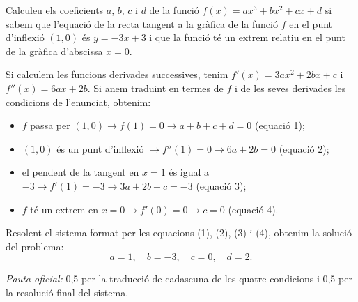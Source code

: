 \begin{apartats}

Calculeu els coeficients $a$, $b$, $c$ i $d$ de la funció $f(x)=ax^3+bx^2+cx+d$ si sabem que l'equació de la recta
tangent a la gràfica de la funció $f$ en el punt d'inflexió $(1,0)$ és $y=-3x+3$ i que la funció té un extrem relatiu
en el punt de la gràfica d'abscissa $x=0$.

\begin{solucio}
Si calculem les funcions derivades successives, tenim $f'(x)=3ax^2+2bx+c$ i $f''(x)=6ax+2b$. Si anem traduint en
termes de $f$ i de les seves derivades les condicions de l'enunciat, obtenim:
\begin{itemize}
\item $f$ passa per $(1,0)\rightarrow f(1)=0\rightarrow a+b+c+d=0$ (equació 1);
\item $(1,0)$ és un punt d'inflexió $\rightarrow f''(1)=0\rightarrow6a+2b=0$ (equació 2);
\item el pendent de la tangent en $x=1$ és igual a $-3\rightarrow f'(1)=-3\rightarrow3a+2b+c=-3$ (equació 3);
\item $f$ té un extrem en $x=0\rightarrow f'(0)=0\rightarrow c=0$ (equació 4).
\end{itemize}
Resolent el sistema format per les equacions (1), (2), (3) i (4), obtenim la solució del problema:
\[
\boxed{a=1,\quad b=-3,\quad c=0,\quad d=2}.
\]

\textit{Pauta oficial:} 0,5 per la traducció de cadascuna de les quatre condicions i 0,5 per la resolució final del
sistema.
\end{solucio}

\end{apartats}
